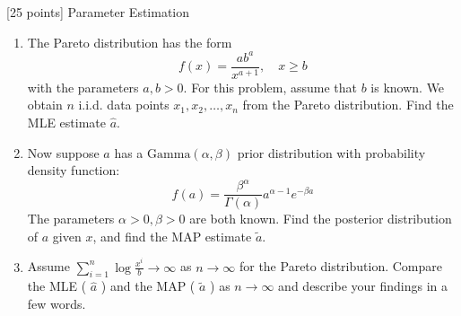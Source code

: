 [25 points] Parameter Estimation\\
\begin{enumerate}
\item The Pareto distribution has the form $$f(x) = \frac{ab^a}{x^{a+1}}, \quad x \geq b$$
with the parameters $a, b > 0$. For this problem, assume that $b$ is known. We obtain $n$ i.i.d. data points $x_1, x_2, \hdots, x_n$ from the Pareto distribution. Find the MLE estimate $\widehat{a}$.
\vspace{1cm}
\item Now suppose $a$ has a $\mathrm{Gamma}(\alpha, \beta)$ prior distribution with probability density function:$$f(a) = \frac{\beta^\alpha}{\Gamma (\alpha)} a^{\alpha-1} e^{-\beta a}$$
The parameters $\alpha > 0, \beta > 0$ are both known. Find the posterior distribution of $a$ given $x$, and find the MAP estimate $\widetilde{a}$.
\vspace{1cm}
\item Assume $\sum_{i=1}^n \log\frac{x^i}{b} \to \infty$ as $n \to \infty$ for the Pareto distribution. Compare the MLE ( $\widehat{a}$ ) and the MAP ( $\widetilde{a}$ ) as $n \to \infty$ and describe your findings in a few words.
\end{enumerate}